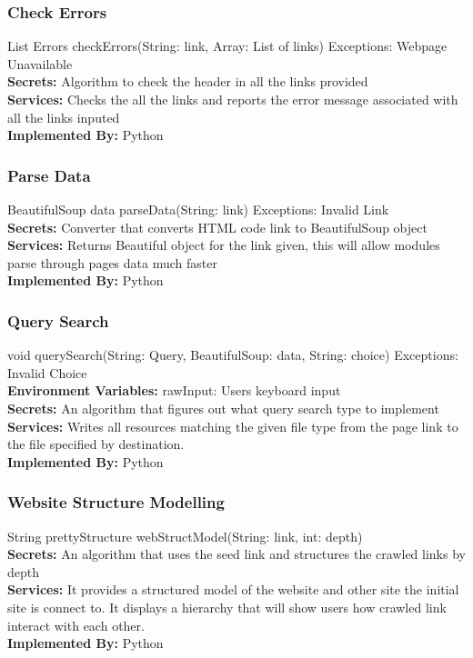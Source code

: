 \documentclass[titlepage]{article}
\begin{document}
\subsubsection{Check Errors}
List Errors checkErrors(String: link, Array: List of links) Exceptions: Webpage Unavailable\\
\textbf{Secrets:}
Algorithm to check the header in all the links provided \\
\textbf{Services:}
Checks the all the links and reports the error message associated with all the links inputed\\
\textbf{Implemented By:} Python

\subsubsection{Parse Data}
BeautifulSoup data parseData(String: link) Exceptions: Invalid Link\\
\textbf{Secrets:}
Converter that converts HTML code link to BeautifulSoup object \\
\textbf{Services:}
Returns Beautiful object for the link given, this will allow modules parse through pages data much faster\\
\textbf{Implemented By:} Python

\subsubsection{Query Search}
void querySearch(String: Query, BeautifulSoup: data, String: choice) Exceptions: Invalid Choice\\
\textbf{Environment Variables:}
rawInput: Users keyboard input\\
\textbf{Secrets:}
An algorithm that figures out what query search type to implement \\
\textbf{Services:}
Writes all resources matching the given file type from the page link to the file specified by destination.\\
\textbf{Implemented By:} Python

\subsubsection{Website Structure Modelling}
String prettyStructure webStructModel(String: link, int: depth)\\
\textbf{Secrets:}
 An algorithm that uses the seed link and structures the crawled links by depth\\
\textbf{Services:}
It provides a structured model of the website and other site the initial site is connect to. It displays a hierarchy that will show users how crawled link interact with each other.\\
\textbf{Implemented By:} Python
\end{document}
